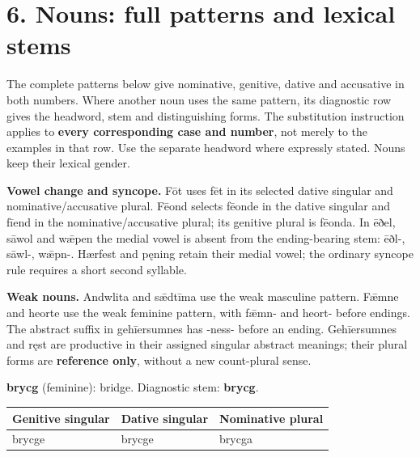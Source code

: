 \section*{6. Nouns: full patterns and lexical stems}

The complete patterns below give nominative, genitive, dative and accusative in both numbers. Where another noun uses the same pattern, its diagnostic row gives the headword, stem and distinguishing forms. The substitution instruction applies to \textbf{every corresponding case and number}, not merely to the examples in that row. Use the separate headword where expressly stated. Nouns keep their lexical gender.

\textbf{Vowel change and syncope.} Fōt uses fēt in its selected dative singular and nominative/\allowbreak{}accusative plural. Fēond selects fēonde in the dative singular and fīend in the nominative/\allowbreak{}accusative plural; its genitive plural is fēonda. In ēðel, sāwol and wǣpen the medial vowel is absent from the ending-bearing stem: ēðl-, sāwl-, wǣpn-. Hærfest and pęning retain their medial vowel; the ordinary syncope rule requires a short second syllable.

\textbf{Weak nouns.} Andwlita and sǣdtīma use the weak masculine pattern. Fǣmne and heorte use the weak feminine pattern, with fǣmn- and heort- before endings. The abstract suffix in gehīersumnes has -ness- before an ending. Gehīersumnes and ręst are productive in their assigned singular abstract meanings; their plural forms are \textbf{reference only}, without a new count-plural sense.

\textbf{brycg} (feminine): bridge. Diagnostic stem: \textbf{brycg}.

\par\begingroup
\fontsize{10.5}{13.2}\selectfont
\setlength{\LTleft}{0pt}\setlength{\LTright}{\fill}
\noindent
\begin{tabular}{@{}>{\raggedright\arraybackslash}p{39.24mm}>{\raggedright\arraybackslash}p{36.31mm}>{\raggedright\arraybackslash}p{42.82mm}@{}}
\toprule
\textbf{Genitive singular} & \textbf{Dative singular} & \textbf{Nominative plural} \\
\midrule
brycge & brycge & brycga \\
\bottomrule
\end{tabular}
\par\endgroup

